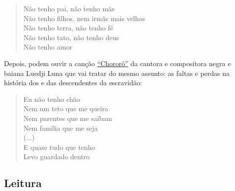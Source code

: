 \documentclass[11pt]{extarticle}
\begin{document}
\begin{enumerate}
\begin{verse}
\vspace{5mm}

Não tenho pai, não tenho mãe\\
Não tenho filhos, nem irmãs mais velhas\\
Não tenho terra, não tenho fé\\
Não tenho tato, não tenho deus\\
Não tenho amor\\
\end{verse}


Depois, podem ouvir a canção \href{https://www.youtube.com/watch?v=KaZeU__e5q4}{``Chororô''} da 
cantora e compositora negra e baiana Luedji 
Luna que vai tratar do mesmo assunto: as faltas e perdas na história
dos e das descendentes da escravidão:

\begin{verse}Eu não tenho chão\\
Nem um teto que me queira\\
Nem parentes que me saibam\\
Nem família que me seja\\
\vspace{2mm}
(...)\\
\vspace{2mm}
E quase tudo que tenho\\
Levo guardado dentro\\
\end{verse}



\end{enumerate}

\subsection{Leitura}
\end{document}
